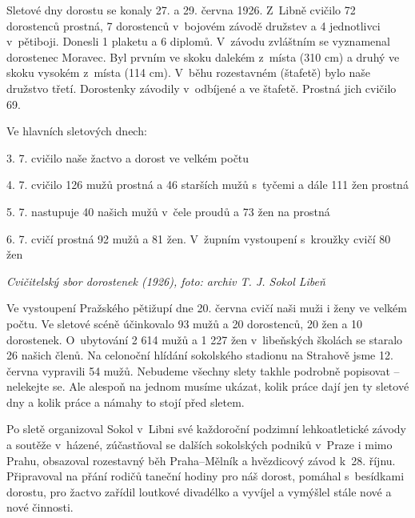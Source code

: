 \documentclass[a5paper, 12pt, twoside]{article}
\begin{document}
Sletové dny dorostu se konaly 27. a 29. června 1926. Z~Libně cvičilo 72
dorostenců prostná, 7 dorostenců v~bojovém závodě družstev a 4
jednotlivci v~pětiboji. Donesli 1 plaketu a 6 diplomů. V~závodu
zvláštním se vyznamenal dorostenec Moravec. Byl prvním ve skoku dalekém
z~místa (310 cm) a druhý ve skoku vysokém z~místa (114 cm). V~běhu
rozestavném (štafetě) bylo naše družstvo třetí. Dorostenky závodily
v~odbíjené a ve štafetě. Prostná jich cvičilo 69.

Ve hlavních sletových dnech:

3. 7. cvičilo naše žactvo a dorost ve velkém počtu

4. 7. cvičilo 126 mužů prostná a 46 starších mužů s~tyčemi a dále 111
žen prostná

5. 7. nastupuje 40 našich mužů v~čele proudů a 73 žen na prostná

6. 7. cvičí prostná 92 mužů a 81 žen. V~župním vystoupení s~kroužky
cvičí 80 žen


\textit{Cvičitelský sbor dorostenek (1926), foto: archiv T. J. Sokol
Libeň}

Ve vystoupení Pražského pětižupí dne 20. června cvičí naši muži i ženy
ve velkém počtu. Ve sletové scéně účinkovalo 93 mužů a 20 dorostenců, 20
žen a 10 dorostenek. O~ubytování 2 614 mužů a 1 227 žen v~libeňských
školách se staralo 26 našich členů. Na celonoční hlídání sokolského
stadionu na Strahově jsme 12. června vypravili 54 mužů. Nebudeme všechny
slety takhle podrobně popisovat -- nelekejte se. Ale alespoň na jednom
musíme ukázat, kolik práce dají jen ty sletové dny a kolik práce a
námahy to stojí před sletem.

Po sletě organizoval Sokol v~Libni své každoroční podzimní
lehkoatletické závody a soutěže v~házené, zúčastňoval se dalších
sokolských podniků v~Praze i mimo Prahu, obsazoval rozestavný běh
Praha--Mělník a hvězdicový závod k~28. říjnu. Připravoval na přání
rodičů taneční hodiny pro náš dorost, pomáhal s~besídkami dorostu, pro
žactvo zařídil loutkové divadélko a vyvíjel a vymýšlel stále nové a nové
činnosti.
\end{document}
